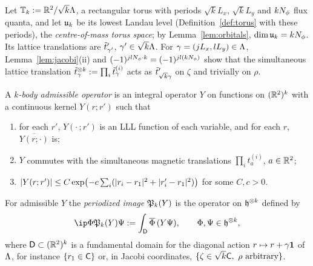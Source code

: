 Let $\mathbb{T}_k:=\mathbb{R}^2/\sqrt k\Lambda$, a rectangular torus with periods $\sqrt kL_x$, $\sqrt kL_y$ and $kN_{\phi}$ flux quanta, and
let $\mathfrak{u}_k$ be its lowest Landau level (Definition~\ref{def:torus} with these periods), the \emph{centre-of-mass
torus space}; by Lemma~\ref{lem:orbitals}, $\dim\mathfrak{u}_k=kN_{\phi}$. Its lattice translations are $\tilde t'_{\gamma'}$,
$\gamma'\in\sqrt k\Lambda$. For $\gamma=(jL_x,lL_y)\in\Lambda$, Lemma~\ref{lem:jacobi}(ii) and $(-1)^{jlN_{\phi}\cdot k}=(-1)^{jl(kN_{\phi})}$ show
that the simultaneous lattice translation $\tilde t^{\otimes k}_\gamma:=\prod_i\tilde t^{(i)}_\gamma$ acts as $\tilde t'_{\sqrt k\gamma}$ on $\zeta$ and trivially on
$\rho$.

\begin{definition}\label{def:admissible}
A \emph{$k$-body admissible operator} is an integral operator $Y$ on functions on $(\mathbb{R}^2)^k$ with a continuous kernel
$Y(r;r')$ such that
\begin{enumerate}[(Y1)]
\item for each $r'$, $Y(\cdot\,;r')$ is an LLL function of each variable, and for each $r$, $\overline{Y(r;\cdot)}$ is;
\item $Y$ commutes with the simultaneous magnetic translations $\prod_it_a^{(i)}$, $a\in\mathbb{R}^2$;
\item $\lvert Y(r;r')\rvert\le C\exp\bigl(-c\sum_i(\lvert r_i-r_1\rvert^2+\lvert r'_i-r_1\rvert^2)\bigr)$ for some $C,c>0$.
\end{enumerate}
For admissible $Y$ the \emph{periodized image} $\mathfrak{P}_k(Y)$ is the operator on $\mathfrak{h}^{\otimes k}$ defined by
\begin{equation}\label{eq:Pk}
\ip\Phi{\Pp_k(Y)\Psi}:=\int_{\mathsf D}\overline{\Phi}\,(Y\Psi),\qquad \Phi,\Psi\in\h^{\otimes k},
\end{equation}
where $\mathsf D\subset(\mathbb{R}^2)^k$ is a fundamental domain for the diagonal action $r\mapsto r+\gamma\mathbf{1}$ of $\Lambda$, for
instance $\{r_1\in\mathsf{C}\}$ or, in Jacobi coordinates, $\{\zeta\in\sqrt k\cell,\ \rho\ \text{arbitrary}\}$.
\end{definition}

